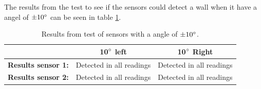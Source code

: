The results from the test to see if the sensors could detect a wall when it have a angel of $\pm 10 \degree$ can be seen in table \ref{tab:sensorAngelRes}.
\begin{table}[H]
    \centering
    \begin{tabular}{|c|c|c|}
    \hline
             & \textbf{10$\degree$ left} & \textbf{10$\degree$ Right}  \\ \hline
    \textbf{Results sensor 1:} & Detected in all readings  & Detected in all readings    \\ \hline
    \textbf{Results sensor 2:} & Detected in all readings  & Detected in all readings    \\ \hline
    \end{tabular}
    \caption{Results from test of sensors with a angle of $\pm 10 \degree$.}
    \label{tab:sensorAngelRes}
\end{table}

%
